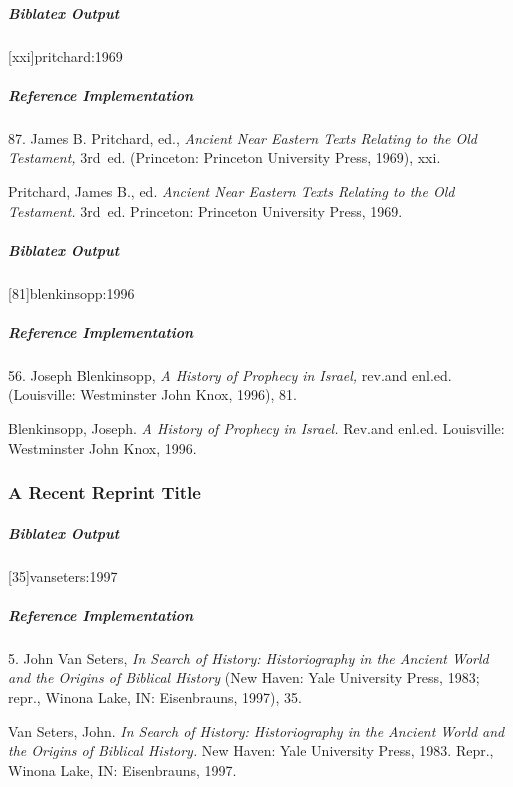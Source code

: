 \documentclass[a4paper]{article}
\newenvironment{biboutput}{%
  \subparagraph{Biblatex Output}
}{\color{black}}
\newenvironment{refimp}{%
  \subparagraph{Reference Implementation}
  \color{reference-colour}
  \rm
}{\par\color{black}}
\begin{document}
\begin{biboutput}
  [xxi]{pritchard:1969}
\end{biboutput}

\begin{refimp}
  \hspace*{\bibindent}87. James B. Pritchard, ed., \emph{Ancient Near Eastern
  Texts Relating to the Old Testament,} 3rd~ed. (Princeton: Princeton
  University Press, 1969), xxi.

  \hangindent\bibindent Pritchard, James B., ed. \emph{Ancient Near Eastern
  Texts Relating to the Old Testament.} 3rd~ed. Princeton: Princeton
  University Press, 1969.
\end{refimp}

\begin{biboutput}
  [81]{blenkinsopp:1996}
\end{biboutput}

\begin{refimp}
  \hspace*{\bibindent}56. Joseph Blenkinsopp, \emph{A History of Prophecy in
  Israel,} rev.\@ and enl.\@ ed. (Louisville: Westminster John Knox, 1996), 81.

  \hangindent\bibindent Blenkinsopp, Joseph. \emph{A History of Prophecy in
  Israel.} Rev.\@ and enl.\@ ed. Louisville: Westminster John Knox, 1996.
\end{refimp}

\subsubsection{A Recent Reprint Title}

\begin{biboutput}
  [35]{vanseters:1997}
\end{biboutput}

\begin{refimp}
  \hspace*{\bibindent}5. John Van Seters, \emph{In Search of History:
  Historiography in the Ancient World and the Origins of Biblical History}
  (New Haven: Yale University Press, 1983; repr., Winona Lake, IN:
  Eisenbrauns, 1997), 35.

  \hangindent\bibindent Van Seters, John. \emph{In Search of History:
  Historiography in the Ancient World and the Origins of Biblical History.}
  New Haven: Yale University Press, 1983. Repr., Winona Lake, IN: Eisenbrauns,
  1997.
\end{refimp}
\end{document}
